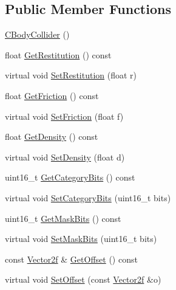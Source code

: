\subsection*{Public Member Functions}
\begin{DoxyCompactItemize}
\item 
\hyperlink{classastu_1_1suite2d_1_1CBodyCollider_a53b70ad4182f2e4b6520cd4078cf55ad}{C\+Body\+Collider} ()
\item 
float \hyperlink{classastu_1_1suite2d_1_1CBodyCollider_a3323f62162d237b44858fc1ee53fa5b1}{Get\+Restitution} () const
\item 
virtual void \hyperlink{classastu_1_1suite2d_1_1CBodyCollider_a28a503811fbdcc29fe1fa6204f82bd8a}{Set\+Restitution} (float r)
\item 
float \hyperlink{classastu_1_1suite2d_1_1CBodyCollider_aa707f66fb6b9fd9ce21aedaed43837ff}{Get\+Friction} () const
\item 
virtual void \hyperlink{classastu_1_1suite2d_1_1CBodyCollider_ab457509068d608af68158417e32a023d}{Set\+Friction} (float f)
\item 
float \hyperlink{classastu_1_1suite2d_1_1CBodyCollider_a79f739655a74fd53e30f645668bd7d85}{Get\+Density} () const
\item 
virtual void \hyperlink{classastu_1_1suite2d_1_1CBodyCollider_abad2e774affa1d966ad1b1b86c76ce51}{Set\+Density} (float d)
\item 
uint16\+\_\+t \hyperlink{classastu_1_1suite2d_1_1CBodyCollider_a46d61eb00e4b1dd78790bed52fca7ac5}{Get\+Category\+Bits} () const
\item 
virtual void \hyperlink{classastu_1_1suite2d_1_1CBodyCollider_af6e02b7f4a1bd613303e0d04518e790b}{Set\+Category\+Bits} (uint16\+\_\+t bits)
\item 
uint16\+\_\+t \hyperlink{classastu_1_1suite2d_1_1CBodyCollider_a4122233f1f658f090600520ecf05ff92}{Get\+Mask\+Bits} () const
\item 
virtual void \hyperlink{classastu_1_1suite2d_1_1CBodyCollider_aa7411ba5c94adecc996d655bd38c7fb8}{Set\+Mask\+Bits} (uint16\+\_\+t bits)
\item 
const \hyperlink{classastu_1_1Vector2}{Vector2f} \& \hyperlink{classastu_1_1suite2d_1_1CBodyCollider_ad874702f1fd7b40e477916deb8f39289}{Get\+Offset} () const
\item 
virtual void \hyperlink{classastu_1_1suite2d_1_1CBodyCollider_aa0fe045b29e4207852be567b5e004c91}{Set\+Offset} (const \hyperlink{classastu_1_1Vector2}{Vector2f} \&o)
\end{DoxyCompactItemize}



